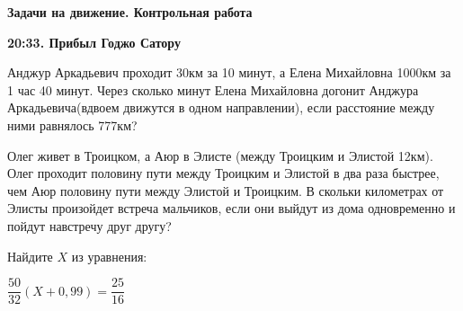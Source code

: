 \centerline{\bf \Huge Задачи на движение. Контрольная работа}
\centerline{\bf \Huge }

\begin{flushright}
        \scriptsize{\textbf{20:33. Прибыл Годжо Сатору}}
\end{flushright}


 Анджур Аркадьевич проходит 30км за 10 минут, а Елена Михайловна 1000км за 1 час 40 минут. Через сколько минут Елена Михайловна догонит Анджура Аркадьевича(вдвоем движутся в одном направлении), если расстояние между ними равнялось 777км?

 Олег живет в Троицком, а Аюр в Элисте (между Троицким и Элистой 12км). Олег проходит половину пути между Троицким и Элистой в два раза быстрее, чем Аюр половину пути между Элистой и Троицким. В скольки километрах от Элисты произойдет встреча мальчиков, если они выйдут из дома одновременно и пойдут навстречу друг другу?

 Найдите $X$ из уравнения:

$\dfrac{50}{32}(X+0,99)=\dfrac{25}{16}$

